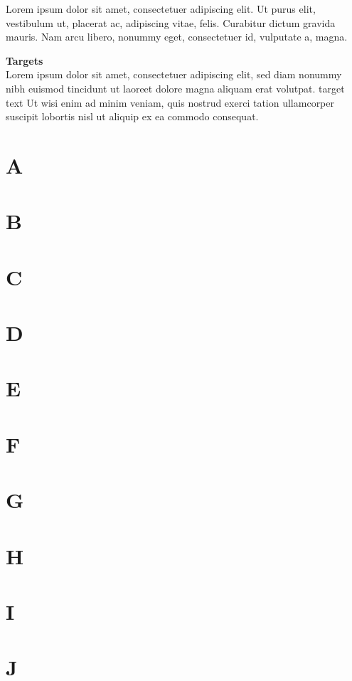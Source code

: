 \documentclass[british]{article}
\begin{document}
Lorem ipsum dolor sit amet, consectetuer adipiscing elit. Ut purus elit,
vestibulum ut, placerat ac, adipiscing vitae, felis. Curabitur dictum gravida
mauris. Nam arcu libero, nonummy eget, consectetuer id, vulputate a, magna.

\pagebreak
{\Large \textbf{Targets}}\\
Lorem ipsum dolor sit amet, consectetuer adipiscing elit, sed diam
nonummy nibh euismod tincidunt ut laoreet dolore magna aliquam erat
volutpat. \hypertarget{target}{target text} Ut wisi enim ad minim
veniam, quis nostrud exerci tation ullamcorper suscipit lobortis
nisl ut aliquip ex ea commodo consequat.

\section[A]{\hypertarget{RefA}{A}} \lipsum[1]
\section[B]{\hypertarget{RefB}{B}} \lipsum[1]
\section[C]{\hypertarget{RefC}{C}} \lipsum[1]
\section[D]{\hypertarget{RefD}{D}} \lipsum[1]
\section[E]{\hypertarget{RefE}{E}} \lipsum[1]
\section[F]{\hypertarget{RefF}{F}} \lipsum[1]
\section[G]{\hypertarget{RefG}{G}} \lipsum[1]
\section[H]{\hypertarget{RefH}{H}} \lipsum[1]
\section[I]{\hypertarget{RefI}{I}} \lipsum[1]
\section[J]{\hypertarget{RefJ}{J}} \lipsum[1]
\end{document}
